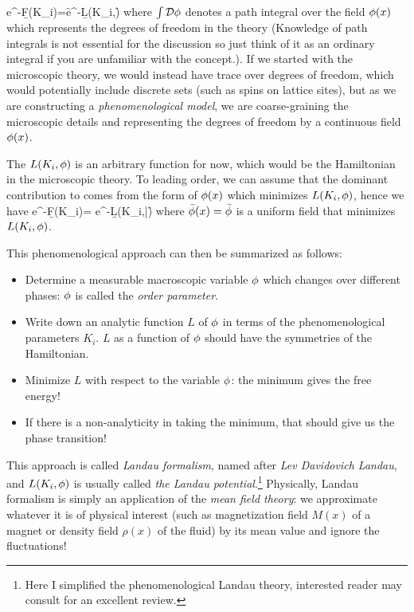 \documentclass[12pt]{article}
\numberwithin{equation}{section}
\begin{document}
\be 
\label{eq: landau potential in path integral}
e^{-\b F(K_i)}=\int \cD\f e^{-\b L(K_i,\f)}
\ee 
where $\int \mathcal{D}\phi$ denotes a path integral over the field $\phi(x)$ which represents the degrees of freedom in the theory (Knowledge of path integrals is not essential for the discussion so just think of it as an ordinary integral if you are unfamiliar with the concept.). If we started with the microscopic theory, we would instead have trace over degrees of freedom, which would potentially include discrete sets (such as spins on lattice sites), but as we are constructing a \emph{phenomenological model}, we are coarse-graining the microscopic details and representing the degrees of freedom by a continuous field $\phi(x)$.

The $L(K_i,\phi)$ is an arbitrary function for now, which would be the Hamiltonian in the microscopic theory. To leading order, we can assume that the dominant contribution to  comes from the form of $\phi(x)$ which minimizes $L(K_i,\phi)$, hence we have 
\be 
e^{-\b F(K_i)}= e^{-\b L(K_i,\bar\f)}
\ee 
where $\bar{\phi}(x)=\bar{\phi}$ is a uniform field that minimizes $L(K_i,\phi)$.

This phenomenological approach can then be summarized as follows:
\begin{itemize}
	\item Determine a measurable macroscopic variable $\phi$ which changes over different phases: $\phi$ is called the \emph{order parameter}.
	\item Write down an analytic function $L$ of $\phi$ in terms of the phenomenological parameters $K_i$. $L$ as a function of $\phi$ should have the symmetries of the Hamiltonian.
	\item Minimize $L$ with respect to the variable $\phi$: the minimum gives the free energy!
	\item If there is a non-analyticity in taking the minimum, that should give us the phase transition!
\end{itemize}
This approach is called \emph{Landau formalism}, named after \emph{Lev Davidovich Landau}, and $L(K_i,\phi)$ is usually called \emph{the Landau potential}.\footnote{Here I simplified the phenomenological Landau theory, interested reader may consult \cite{Goldenfeld:1992qy} for an excellent review.} Physically, Landau formalism is simply an application of the \emph{mean field theory}: we approximate whatever it is of physical interest (such as magnetization field $M(x)$ of a magnet or density field $\rho(x)$ of the fluid) by its mean value and ignore the fluctuations!
\end{document}
